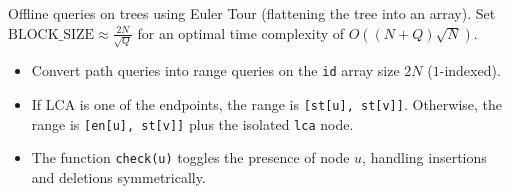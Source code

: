 
Offline queries on trees using Euler Tour (flattening the tree into an array). Set $\text{BLOCK\_SIZE} \approx \frac{2N}{\sqrt{Q}}$ for an optimal time complexity of $O((N + Q)\sqrt{N})$.



\begin{itemize}
    \item Convert path queries into range queries on the \lstinline|id| array size $2N$ ($1$-indexed).
    \item If LCA is one of the endpoints, the range is \lstinline|[st[u], st[v]]|. Otherwise, the range is \lstinline|[en[u], st[v]]| plus the isolated \lstinline|lca| node.
    \item The function \lstinline|check(u)| toggles the presence of node $u$, handling insertions and deletions symmetrically.
\end{itemize}
